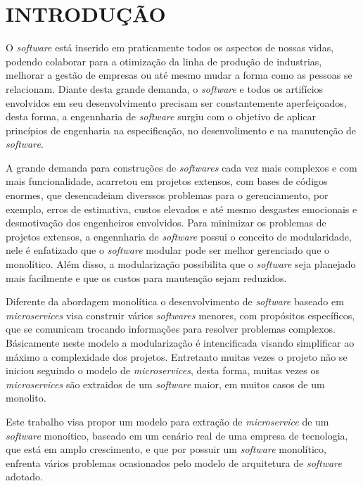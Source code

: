 \setcounter{page}{1}
\chapter{INTRODU\c{C}\~AO}  %
\label{chap:01}

O \textit{software} está inserido em praticamente todos os aspectos de nossas vidas, podendo colaborar para a otimização da linha de produção de industrias, melhorar a gestão de empresas ou até mesmo mudar a forma como as pessoas se relacionam. Diante desta grande demanda, o \textit{software} e todos os artifícios envolvidos em seu desenvolvimento precisam ser constantemente aperfeiçoados, desta forma, a engennharia de \textit{software} surgiu com o objetivo de aplicar princípios de engenharia na especificação, no desenvolimento e na manutenção de \textit{software}.

A grande demanda para construções de \textit{softwares} cada vez mais complexos e com mais funcionalidade, acarretou em projetos extensos, com bases de códigos enormes, que desencadeiam diverssos problemas para o gerenciamento, por exemplo, erros de estimativa, custos elevados e até mesmo desgastes emocionais e desmotivação dos engenheiros envolvidos. Para minimizar os problemas de projetos extensos, a engennharia de \textit{software} possui o conceito de modularidade, nele é enfatizado que o \textit{software} modular pode ser melhor gerenciado que o monolítico. Além disso, a modularização possibilita que o \textit{software} seja planejado mais facilmente e que os custos para mautenção sejam reduzidos.

Diferente da abordagem monolítica o desenvolvimento de \textit{software} baseado em \textit{microservices} visa construir vários \textit{softwares} menores, com propósitos específicos, que se comunicam trocando informações para resolver problemas complexos. Básicamente neste modelo a modularização é intencificada visando simplificar ao máximo a complexidade dos projetos. Entretanto muitas vezes o projeto não se iniciou seguindo o modelo de \textit{microservices}, desta forma, muitas vezes os \textit{microservices} são extraidos de um \textit{software} maior, em muitos casos de um monolito.

Este trabalho visa propor um modelo para extração de \textit{microservice} de um \textit{software} monoítico, baseado em um cenário real de uma empresa de tecnologia, que está em amplo crescimento, e que por possuir um \textit{software} monolítico, enfrenta vários problemas ocasionados pelo modelo de arquitetura de \textit{software} adotado.

